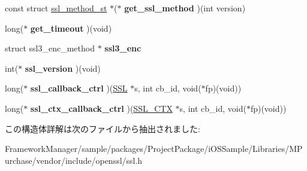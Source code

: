\begin{DoxyCompactItemize}
\item 
\hypertarget{structssl__method__st_a601499546a57b7fc73461cca2588a316}{}const struct \hyperlink{structssl__method__st}{ssl\+\_\+method\+\_\+st} $\ast$($\ast$ {\bfseries get\+\_\+ssl\+\_\+method} )(int version)\label{structssl__method__st_a601499546a57b7fc73461cca2588a316}

\item 
\hypertarget{structssl__method__st_a5a153fd1d3f82198c14ceca526c07efa}{}long($\ast$ {\bfseries get\+\_\+timeout} )(void)\label{structssl__method__st_a5a153fd1d3f82198c14ceca526c07efa}

\item 
\hypertarget{structssl__method__st_aa9b5c4c60c391bc6771bd035aa10ce0a}{}struct ssl3\+\_\+enc\+\_\+method $\ast$ {\bfseries ssl3\+\_\+enc}\label{structssl__method__st_aa9b5c4c60c391bc6771bd035aa10ce0a}

\item 
\hypertarget{structssl__method__st_a84b47953e71129319b367394a6daca4b}{}int($\ast$ {\bfseries ssl\+\_\+version} )(void)\label{structssl__method__st_a84b47953e71129319b367394a6daca4b}

\item 
\hypertarget{structssl__method__st_ac8ad5e3ad9b93cad8439c0af2c280c56}{}long($\ast$ {\bfseries ssl\+\_\+callback\+\_\+ctrl} )(\hyperlink{structssl__st}{S\+S\+L} $\ast$s, int cb\+\_\+id, void($\ast$fp)(void))\label{structssl__method__st_ac8ad5e3ad9b93cad8439c0af2c280c56}

\item 
\hypertarget{structssl__method__st_a993fb1170221e955a38978690bbfde45}{}long($\ast$ {\bfseries ssl\+\_\+ctx\+\_\+callback\+\_\+ctrl} )(\hyperlink{structssl__ctx__st}{S\+S\+L\+\_\+\+C\+T\+X} $\ast$s, int cb\+\_\+id, void($\ast$fp)(void))\label{structssl__method__st_a993fb1170221e955a38978690bbfde45}

\end{DoxyCompactItemize}


この構造体詳解は次のファイルから抽出されました\+:\begin{DoxyCompactItemize}
\item 
Framework\+Manager/sample/packages/\+Project\+Package/i\+O\+S\+Sample/\+Libraries/\+M\+Purchase/vendor/include/openssl/ssl.\+h\end{DoxyCompactItemize}
